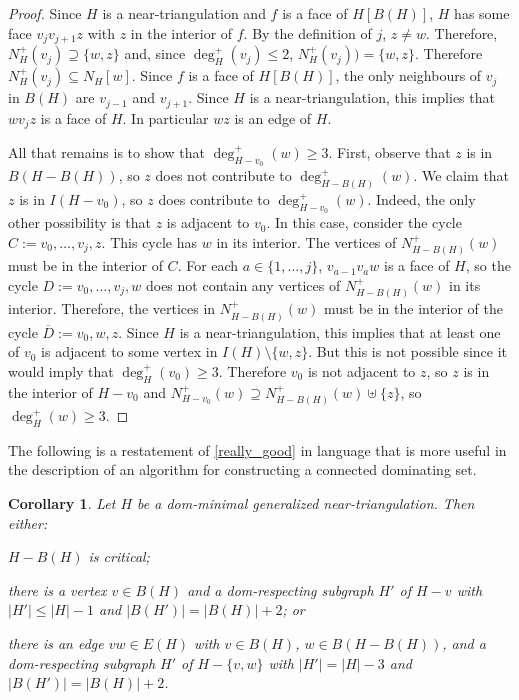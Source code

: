 \documentclass[12pt]{article}
\newtheorem{cor}{Corollary}
\theoremstyle{definition}
\begin{document}
\begin{proof}
  Since $H$ is a near-triangulation and $f$ is a face of $H[B(H)]$, $H$ has some face $v_j v_{j+1} z$ with $z$ in the interior of $f$.  By the definition of $j$, $z\neq w$.  Therefore, $N_H^+(v_j)\supseteq \{w,z\}$ and, since $\deg^+_H(v_j)\le 2$, $N_H^+(v_j))= \{w,z\}$.  Therefore $N^+_H(v_j)\subseteq N_H[w]$.  Since $f$ is a face of $H[B(H)]$, the only neighbours of $v_j$ in $B(H)$ are $v_{j-1}$ and $v_{j+1}$. Since $H$ is a near-triangulation, this implies that $w v_j z$ is a face of $H$.  In particular $wz$ is an edge of $H$.

  All that remains is to show that $\deg^+_{H-v_0}(w)\ge 3$.  First, observe that $z$ is in $B(H-B(H))$, so $z$ does not contribute to $\deg^+_{H-B(H)}(w)$. We claim that $z$ is in $I(H-v_0)$, so $z$ does contribute to $\deg^+_{H-v_0}(w)$.   Indeed, the only other possibility is that $z$ is adjacent to $v_0$.  In this case, consider the cycle $C:=v_0,\ldots,v_j,z$.  This cycle has $w$ in its interior. The vertices of $N^+_{H-B(H)}(w)$ must be in the interior of $C$. For each $a\in\{1,\ldots,j\}$, $v_{a-1}v_a w$ is a face of $H$, so the cycle $D:=v_0,\ldots,v_j,w$ does not contain any vertices of $N^+_{H-B(H)}(w)$ in its interior.  Therefore, the vertices in $N^+_{H-B(H)}(w)$ must be in the interior of the cycle $\overline{D}:=v_0,w,z$.  Since $H$ is a near-triangulation, this implies that at least one of $v_0$ is adjacent to some vertex in $I(H)\setminus\{w,z\}$. But this is not possible since it would imply that $\deg^+_H(v_0)\ge 3$.  Therefore $v_0$ is not adjacent to $z$, so $z$ is in the interior of $H-v_0$ and $N^+_{H-v_0}(w)\supseteq N^+_{H-B(H)}(w)\uplus\{z\}$, so $\deg^+_H(w)\ge 3$.
\end{proof}


The following is a restatement of \cref{really_good} in language that is more useful in the description of an algorithm for constructing a connected dominating set.

\begin{cor}\label{really_good_cor}
  Let $H$ be a dom-minimal generalized near-triangulation.  Then either:
  \begin{compactenum}[(1)]
    \item $H-B(H)$ is critical;
    \item there is a vertex $v\in B(H)$ and a dom-respecting subgraph $H'$ of  $H-v$ with $|H'|\le |H|-1$ and $|B(H')|=|B(H)|+2$; or
    \item there is an edge $vw\in E(H)$ with $v\in B(H)$, $w\in B(H-B(H))$, and a dom-respecting subgraph $H'$ of $H-\{v,w\}$ with $|H'|= |H|-3$ and $|B(H')|=|B(H)|+2$.
  \end{compactenum}
\end{cor}
\end{document}
